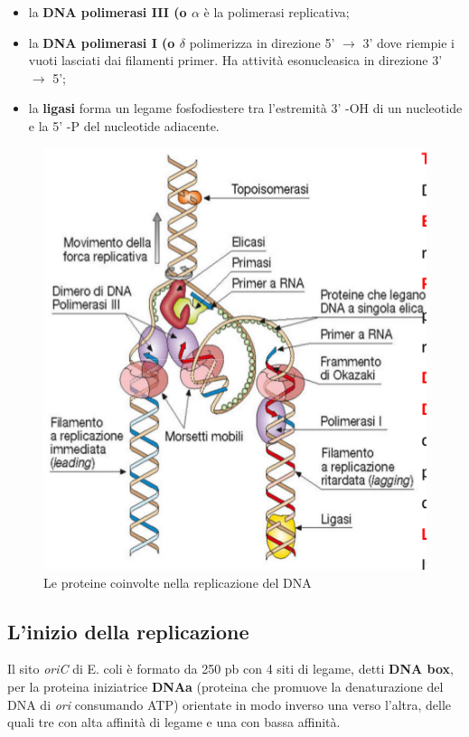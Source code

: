 \documentclass[11pt]{book}
\begin{document}
\begin{itemize}
\item la \textbf{DNA polimerasi III (o $\alpha$} è la polimerasi replicativa;
\item la \textbf{DNA polimerasi I (o $\delta$} polimerizza in direzione 5’ $\to$ 3’ dove riempie i vuoti lasciati dai filamenti primer. Ha attività esonucleasica in direzione 3’ $\to$ 5’;
\item la \textbf{ligasi} forma un legame fosfodiestere tra l’estremità 3’ -OH di un nucleotide e la 5’ -P del nucleotide adiacente.
\end{itemize}

\clearpage
\begin{figure}[htp]
\centering
\includegraphics[scale=0.5]{img/Proteine replicazione.png}
\caption{Le proteine coinvolte nella replicazione del DNA}
\label{}
\end{figure}


\subsection{L'inizio della replicazione} 
Il sito \emph{oriC} di E. coli è  formato da 250 pb con 4 siti di legame, detti \textbf{DNA box}, per la proteina iniziatrice \textbf{DNAa} (proteina che promuove la denaturazione del DNA di \emph{ori} consumando ATP) orientate in modo inverso una verso l’altra, delle quali tre con alta affinità di legame e una con bassa affinità. 
\end{document}
